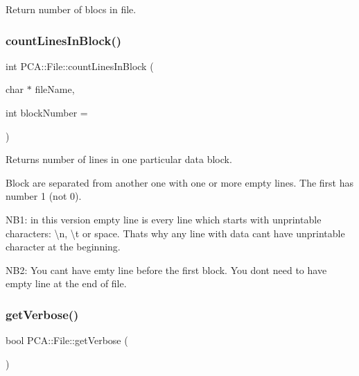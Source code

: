 Return number of blocs in file. 

\hypertarget{class_p_c_a_1_1_file_a832795e34ab12c9fd127bdf99d89efa3}{}\label{class_p_c_a_1_1_file_a832795e34ab12c9fd127bdf99d89efa3} 
\subsubsection{\texorpdfstring{count\+Lines\+In\+Block()}{countLinesInBlock()}}
{\footnotesize\ttfamily int P\+C\+A\+::\+File\+::count\+Lines\+In\+Block (\begin{DoxyParamCaption}\item[{char $\ast$}]{file\+Name,  }\item[{int}]{block\+Number = {} }\end{DoxyParamCaption})\hspace{0.3cm}{\ttfamily [static]}}



Returns number of lines in one particular data block. 

Block are separated from another one with one or more empty lines. The first has number 1 (not 0).

N\+B1\+: in this version empty line is every line which starts with unprintable characters\+: \textbackslash{}n, \textbackslash{}t or space. That\textquotesingle{}s why any line with data can\textquotesingle{}t have unprintable character at the beginning.

N\+B2\+: You can\textquotesingle{}t have emty line before the first block. You don\textquotesingle{}t need to have empty line at the end of file. \hypertarget{class_p_c_a_1_1_file_aa080868b37deb641c3369c397f84fd1b}{}\label{class_p_c_a_1_1_file_aa080868b37deb641c3369c397f84fd1b} 
\subsubsection{\texorpdfstring{get\+Verbose()}{getVerbose()}}
{\footnotesize\ttfamily bool P\+C\+A\+::\+File\+::get\+Verbose (\begin{DoxyParamCaption}{ }\end{DoxyParamCaption})\hspace{0.3cm}{\ttfamily [static]}}

